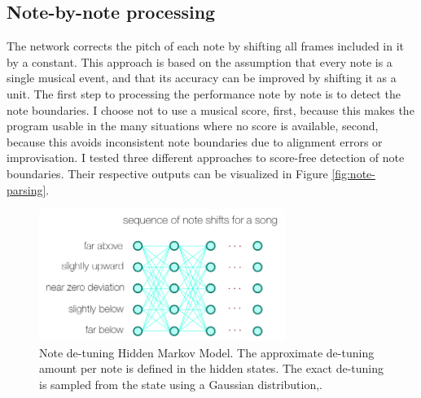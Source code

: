 \subsection{Note-by-note processing}
\label{sec:notes}
The network corrects the pitch of each note by shifting all frames included in it by a constant. This approach is based on the assumption that every note is a single musical event, and that its accuracy can be improved by shifting it as a unit. The first step to processing the performance note by note is to detect the note boundaries. I choose not to use a musical score, first, because this makes the program usable in the many situations where no score is available, second, because this avoids inconsistent note boundaries due to alignment errors or improvisation. I tested three different approaches to score-free detection of note boundaries. Their respective outputs can be visualized in Figure \ref{fig:note-parsing}.
\begin{figure}[t!]
    \centering
    \includegraphics[width=8cm]{images/note_detuning_hmm.png}
    \caption{Note de-tuning Hidden Markov Model. The approximate de-tuning amount per note is defined in the hidden states. The exact de-tuning is sampled from the state using a Gaussian distribution,.}
    \label{fig:detuning_hmm}
\end{figure}

